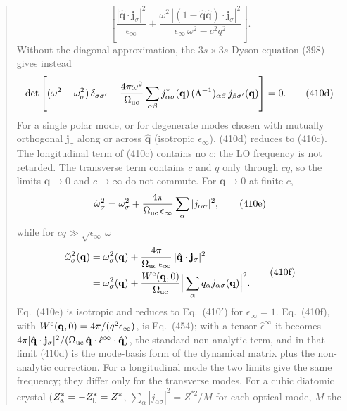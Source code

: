 \documentclass[11pt]{article}
\begin{document}
\begin{quote}
\begin{equation*}
\left[\frac{|\hat{\mathbf q}\cdot\mathbf j_\sigma|^2}{\epsilon_\infty}
+\frac{\omega^2\,|(1-\hat{\mathbf q}\hat{\mathbf q})\cdot\mathbf j_\sigma|^2}{\epsilon_\infty\,\omega^2-c^2q^2}\right].
\tag{410c}
\end{equation*}
Without the diagonal approximation, the $3s\times3s$ Dyson equation (398) gives instead
\begin{equation*}
\det\left[(\omega^2-\omega^2_\sigma)\,\delta_{\sigma\sigma'}
-\frac{4\pi\omega^2}{\Omega_{\rm uc}}\sum_{\alpha\beta}j^*_{\alpha\sigma}(\mathbf q)\,(\Lambda^{-1})_{\alpha\beta}\,
j_{\beta\sigma'}(\mathbf q)\right]=0 .
\tag{410d}
\end{equation*}
For a single polar mode, or for degenerate modes chosen with mutually orthogonal $\mathbf j_\sigma$ along
or across $\hat{\mathbf q}$ (isotropic $\epsilon_\infty$), (410d) reduces to (410c). The longitudinal term
of (410c) contains no $c$: the LO frequency is not retarded. The transverse term contains $c$ and $q$
only through $cq$, so the limits $\mathbf q\to0$ and $c\to\infty$ do not commute. For $\mathbf q\to0$ at
finite $c$,
\begin{equation*}
\tilde\omega^2_\sigma=\omega^2_\sigma+\frac{4\pi}{\Omega_{\rm uc}\,\epsilon_\infty}\sum_\alpha|j_{\alpha\sigma}|^2 ,
\tag{410e}
\end{equation*}
while for $cq\gg\sqrt{\epsilon_\infty}\,\omega$
\begin{equation*}
\begin{aligned}
\tilde\omega^2_\sigma(\mathbf q)&=\omega^2_\sigma(\mathbf q)+\frac{4\pi}{\Omega_{\rm uc}\,\epsilon_\infty}\,
|\hat{\mathbf q}\cdot\mathbf j_\sigma|^2\\
&=\omega^2_\sigma(\mathbf q)+\frac{W^{\rm e}(\mathbf q,0)}{\Omega_{\rm uc}}\Big|\sum_\alpha q_\alpha
j_{\alpha\sigma}(\mathbf q)\Big|^2 .
\end{aligned}
\tag{410f}
\end{equation*}
Eq.~(410e) is isotropic and reduces to Eq.~(410$'$) for $\epsilon_\infty=1$. Eq.~(410f), with
$W^{\rm e}(\mathbf q,0)=4\pi/(q^2\epsilon_\infty)$, is Eq.~(454); with a tensor $\hat\epsilon^\infty$ it becomes
$4\pi|\hat{\mathbf q}\cdot\mathbf j_\sigma|^2/(\Omega_{\rm uc}\,\hat{\mathbf q}\cdot\hat\epsilon^\infty\cdot
\hat{\mathbf q})$, the standard non-analytic term, and in that limit (410d) is the mode-basis form of the
dynamical matrix plus the non-analytic correction. For a longitudinal mode the two limits give the same
frequency; they differ only for the transverse modes. For a cubic diatomic crystal
($Z^*_{\rm a}=-Z^*_{\rm b}=Z^*$, $\sum_\alpha|j_{\alpha\sigma}|^2=Z^{*2}/M$ for each optical mode, $M$ the

\end{quote}
\end{document}
